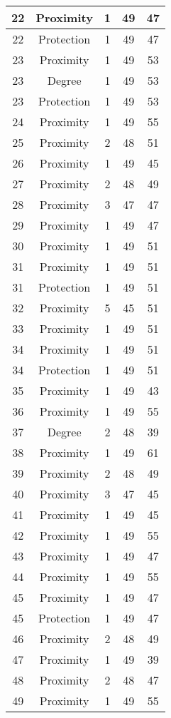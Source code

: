 \documentclass[results.tex]{subfiles}
\begin{document}
\begin{center}
\begin{tabular}{| c || c | c | c | c |}
    \hline
    22 & Proximity & 1 & 49 & 47 \\ 
    \hline
    22 & Protection & 1 & 49 & 47 \\ 
    \hline
    23 & Proximity & 1 & 49 & 53 \\ 
    \hline
    23 & Degree & 1 & 49 & 53 \\ 
    \hline
    23 & Protection & 1 & 49 & 53 \\ 
    \hline
    24 & Proximity & 1 & 49 & 55 \\ 
    \hline
    25 & Proximity & 2 & 48 & 51 \\ 
    \hline
    26 & Proximity & 1 & 49 & 45 \\ 
    \hline
    27 & Proximity & 2 & 48 & 49 \\ 
    \hline
    28 & Proximity & 3 & 47 & 47 \\ 
    \hline
    29 & Proximity & 1 & 49 & 47 \\ 
    \hline
    30 & Proximity & 1 & 49 & 51 \\ 
    \hline
    31 & Proximity & 1 & 49 & 51 \\ 
    \hline
    31 & Protection & 1 & 49 & 51 \\ 
    \hline
    32 & Proximity & 5 & 45 & 51 \\ 
    \hline
    33 & Proximity & 1 & 49 & 51 \\ 
    \hline
    34 & Proximity & 1 & 49 & 51 \\ 
    \hline
    34 & Protection & 1 & 49 & 51 \\ 
    \hline
    35 & Proximity & 1 & 49 & 43 \\ 
    \hline
    36 & Proximity & 1 & 49 & 55 \\ 
    \hline
    37 & Degree & 2 & 48 & 39 \\ 
    \hline
    38 & Proximity & 1 & 49 & 61 \\ 
    \hline
    39 & Proximity & 2 & 48 & 49 \\ 
    \hline
    40 & Proximity & 3 & 47 & 45 \\ 
    \hline
    41 & Proximity & 1 & 49 & 45 \\ 
    \hline
    42 & Proximity & 1 & 49 & 55 \\ 
    \hline
    43 & Proximity & 1 & 49 & 47 \\ 
    \hline
    44 & Proximity & 1 & 49 & 55 \\ 
    \hline
    45 & Proximity & 1 & 49 & 47 \\ 
    \hline
    45 & Protection & 1 & 49 & 47 \\ 
    \hline
    46 & Proximity & 2 & 48 & 49 \\ 
    \hline
    47 & Proximity & 1 & 49 & 39 \\ 
    \hline
    48 & Proximity & 2 & 48 & 47 \\ 
    \hline
    49 & Proximity & 1 & 49 & 55 \\ 
    \hline   \end{tabular}
\end{center}
\end{document}
